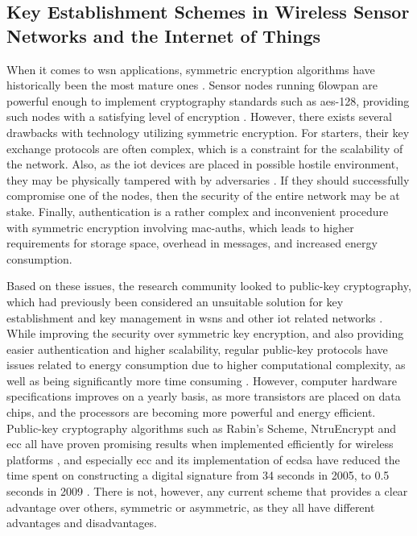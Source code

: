 

\subsection{Key Establishment Schemes in Wireless Sensor Networks and the Internet of Things}

When it comes to \gls{wsn} applications, symmetric encryption algorithms have historically been the most mature ones \citep{Jing2014}. Sensor nodes running \gls{6lowpan} are powerful enough to implement cryptography standards such as \gls{aes}-128, providing such nodes with a satisfying level of encryption \cite{Roman2011147}. However, there exists several drawbacks with technology utilizing symmetric encryption. For starters, their key exchange protocols are often complex, which is a constraint for the scalability of the network. Also, as the \gls{iot} devices are placed in possible hostile environment, they may be physically tampered with by adversaries \cite{krentz20136lowpan}. If they should successfully compromise one of the nodes, then the security of the entire network may be at stake. Finally, authentication is a rather complex and inconvenient procedure with symmetric encryption involving \gls{mac-auth}s, which leads to higher requirements for storage space, overhead in messages, and increased energy consumption.

Based on these issues, the research community looked to public-key cryptography, which had previously been considered  an unsuitable solution for key establishment and key management in \gls{wsn}s and other \gls{iot} related networks \cite{gaubatz2004public, wander2005energy}. While improving the security over symmetric key encryption, and also providing easier authentication and higher scalability, regular public-key protocols have issues related to energy consumption due to higher computational complexity, as well as being significantly more time consuming \cite{Eschenauer2002}. However, computer hardware specifications improves on a yearly basis, as more transistors are placed on data chips, and the processors are becoming more powerful and energy efficient. Public-key cryptography algorithms such as Rabin's Scheme, NtruEncrypt and \gls{ecc} all have proven promising results when implemented efficiently for wireless platforms \cite{Jing2014}, and especially \gls{ecc} and its implementation of \gls{ecdsa} have reduced the time spent on constructing a digital signature from 34 seconds in 2005, to 0.5 seconds in 2009 \cite{Roman2011147}. There is not, however, any current scheme that provides a clear advantage over others, symmetric or asymmetric, as they all have different advantages and disadvantages. 

